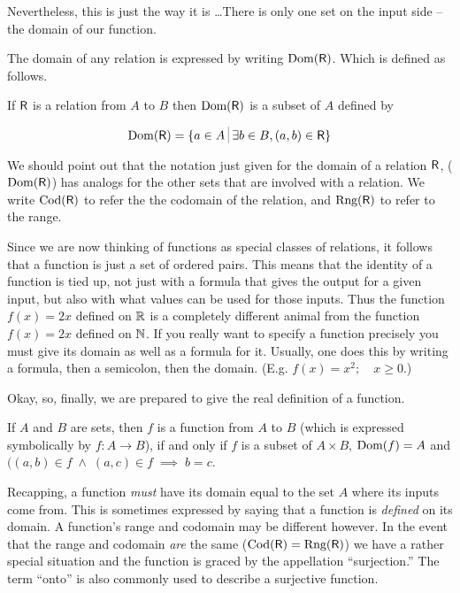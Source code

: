 Nevertheless, this is just the way it is \ldots  There is only one
set on the input side -- the domain of our function. 

The domain of
any relation is expressed by writing $\mbox{Dom}(\mbox{\textsf R})$. Which is 
defined as follows.

\begin{defi}
If $\mbox{\textsf R}$ is a relation from $A$ to $B$ then $\mbox{Dom}(\mbox{\textsf R})$ is
a subset of $A$ defined by

\[ \Dom{\relR} = \{a \in A \suchthat \exists b \in B, (a,b) \in \relR \} 
\]

\end{defi}

We should point out that the notation just given for the domain of a 
relation $\mbox{\textsf R}$, ($\mbox{Dom}(\mbox{\textsf R})$) has analogs for the other 
sets that are involved with a relation.  We write $\mbox{Cod}(\mbox{\textsf R})$
to refer the the codomain of the relation, and $\mbox{Rng}(\mbox{\textsf R})$
to refer to the range. 

Since we are now thinking of functions as special classes of relations, it follows that a function is just 
a set of ordered pairs.  This means that the identity of a function is
tied up, not just with a formula that gives the output for a given input,
but also with what values can be used for those inputs.   Thus the function
$f(x)=2x$ defined on ${\mathbb R}$ is a completely different animal from 
the function $f(x)=2x$ defined on ${\mathbb N}$.  If you really want to
specify a function precisely you must give its domain as well as a 
formula for it.  Usually, one does this by writing a formula, then a 
semicolon, then the domain.  (E.g. $f(x)=x^2; \quad x \geq 0$.)

Okay, so, finally, we are prepared to give the real
definition of a function.

\begin{defi}
If $A$ and $B$ are sets, then $f$ is a function from $A$ to $B$ (which
is expressed symbolically by $f:A\longrightarrow B$), if and only if
$f$ is a subset of $A\times B$, $\mbox{Dom}(f)=A$ and $((a,b) \in f \; \land \; (a,c) \in f \; \implies \; b=c$.
\end{defi}

Recapping, a function \emph{must} have its domain equal to the set $A$
where its inputs come from.  This is sometimes expressed by saying that
a function is \emph{defined} on its domain.  A function's range and codomain
may be different however.  In the event that the range and codomain \emph{are}
the same ($\mbox{Cod}(\mbox{\textsf R}) = \mbox{Rng}(\mbox{\textsf R})$)
we have a rather special situation and the function is graced by
the appellation ``surjection.''  The term ``onto'' is also commonly used
to describe a surjective function.  

